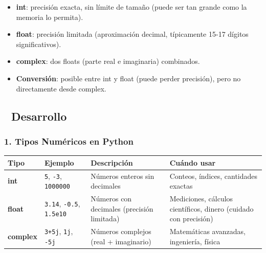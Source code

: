 \documentclass[
  doc,
  floatsintext,
  longtable,
  a4paper,
  nolmodern,
  notxfonts,
  notimes,
  12pt,
  colorlinks=true,linkcolor=blue,citecolor=blue,urlcolor=blue]{apa7}
\providecommand{\tightlist}{%
  \setlength{\itemsep}{0pt}\setlength{\parskip}{0pt}}
\newcounter{none} %
\begin{document}
\begin{itemize}
\tightlist
\item
  \textbf{int}: precisión exacta, sin límite de tamaño (puede ser tan
  grande como la memoria lo permita).
\item
  \textbf{float}: precisión limitada (aproximación decimal, típicamente
  15-17 dígitos significativos).
\item
  \textbf{complex}: dos floats (parte real e imaginaria) combinados.
\item
  \textbf{Conversión}: posible entre int y float (puede perder
  precisión), pero no directamente desde complex.
\end{itemize}

\subsection{📐 Desarrollo}\label{desarrollo}

\subsubsection{1. Tipos Numéricos en
Python}\label{tipos-numuxe9ricos-en-python}

{\def\LTcaptype{none} %
\begin{longtable}[]{@{}
  >{\raggedright\arraybackslash}p{}
  >{\raggedright\arraybackslash}p{}
  >{\raggedright\arraybackslash}p{}
  >{\raggedright\arraybackslash}p{}@{}}
\toprule\noalign{}
\begin{minipage}[b]{\linewidth}\raggedright
Tipo
\end{minipage} & \begin{minipage}[b]{\linewidth}\raggedright
Ejemplo
\end{minipage} & \begin{minipage}[b]{\linewidth}\raggedright
Descripción
\end{minipage} & \begin{minipage}[b]{\linewidth}\raggedright
Cuándo usar
\end{minipage} \\
\midrule\noalign{}
\endhead
\bottomrule\noalign{}
\endlastfoot
\textbf{int} & \texttt{5}, \texttt{-3}, \texttt{1000000} & Números
enteros sin decimales & Conteos, índices, cantidades exactas \\
\textbf{float} & \texttt{3.14}, \texttt{-0.5}, \texttt{1.5e10} & Números
con decimales (precisión limitada) & Mediciones, cálculos científicos,
dinero (cuidado con precisión) \\
\textbf{complex} & \texttt{3+5j}, \texttt{1j}, \texttt{-5j} & Números
complejos (real + imaginario) & Matemáticas avanzadas, ingeniería,
física \\
\end{longtable}
}
\end{document}
